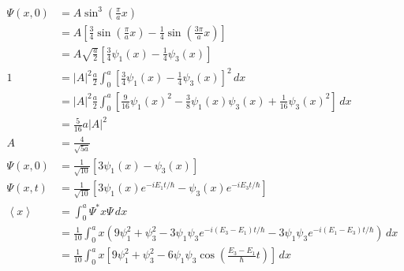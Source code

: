 \documentclass{article}
\newcommand{\ev}[1]{\left< #1 \right>}
\begin{document}
\begin{align*}
  \Psi(x, 0) & = A \sin^3 \left( \frac{\pi}{a} x \right)                                                                                                                          \\
             & = A \left[ \frac{3}{4} \sin \left( \frac{\pi}{a} x \right) - \frac{1}{4} \sin \left( \frac{3 \pi}{a} x \right) \right]                                             \\
             & = A \sqrt{\frac{a}{2}} \left[ \frac{3}{4} \psi_1(x) - \frac{1}{4} \psi_3(x) \right]                                                                                \\
  1          & = |A|^2 \frac{a}{2} \int_0^a \left[ \frac{3}{4} \psi_1(x) - \frac{1}{4} \psi_3(x) \right]^2 \,d x                                                                  \\
             & = |A|^2 \frac{a}{2} \int_0^a \left[ \frac{9}{16} \psi_1(x)^2 - \frac{3}{8} \psi_1(x) \psi_3(x) + \frac{1}{16} \psi_3(x)^2 \right] \,d x                            \\
             & = \frac{5}{16} a |A|^2                                                                                                                                             \\
  A          & = \frac{4}{\sqrt{5 a}}                                                                                                                                             \\
  \Psi(x, 0) & = \frac{1}{\sqrt{10}} [3 \psi_1(x) - \psi_3(x)]                                                                                                                    \\
  \Psi(x, t) & = \frac{1}{\sqrt{10}} [3 \psi_1(x) e^{-i E_1 t / \hbar} - \psi_3(x) e^{-i E_3 t / \hbar}]                                                                          \\
  \ev{x}     & = \int_0^a \Psi^* x \Psi \,d x                                                                                                                                     \\
             & = \frac{1}{10} \int_0^a x \left( 9 \psi_1^2 + \psi_3^2 - 3 \psi_1 \psi_3 e^{-i (E_3 - E_1) t / \hbar} - 3 \psi_1 \psi_3 e^{-i (E_1 - E_3) t / \hbar} \right) \,d x \\
             & = \frac{1}{10} \int_0^a x \left[ 9 \psi_1^2 + \psi_3^2 - 6 \psi_1 \psi_3 \cos \left( \frac{E_3 - E_1}{\hbar} t \right) \right] \,d x                               \\

\end{align*}
\end{document}
